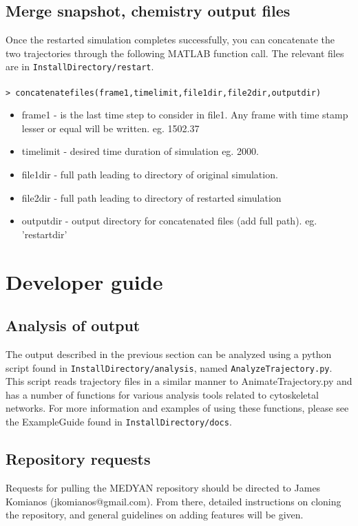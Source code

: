 \documentclass[11pt, oneside]{article}   	%
\begin{document}
\subsection{Merge snapshot, chemistry output files}
Once the restarted simulation completes successfully, you can concatenate the two trajectories through the following MATLAB function call. The relevant files are in \texttt{InstallDirectory/restart}.  \\ \\
\noindent \texttt{> concatenatefiles(frame1,time\textunderscore limit,file1dir,file2dir,outputdir)}\\
\begin{itemize}
\item frame1 - is the last time step to consider in file1. Any frame with time stamp lesser or equal will be written. eg. 1502.37
\item time\textunderscore limit - desired time duration of simulation eg. 2000.
\item file1dir - full path leading to directory of original simulation.
\item file2dir - full path leading to directory of restarted simulation
\item outputdir - output directory for concatenated files (add full path). eg. 'restartdir'
\end{itemize}
\section{Developer guide}

\subsection{Analysis of output}

The output described in the previous section can be analyzed using a python script found in \texttt{InstallDirectory/analysis}, named \texttt{AnalyzeTrajectory.py}. This script reads trajectory files in a similar manner to AnimateTrajectory.py and has a number of functions for various analysis tools related to cytoskeletal networks. For more information and examples of using these functions, please see the ExampleGuide found in \texttt{InstallDirectory/docs}.

\subsection{Repository requests}

Requests for pulling the MEDYAN repository should be directed to James Komianos (jkomianos@gmail.com). From there, detailed instructions on cloning the repository, and general guidelines on adding features will be given.
\end{document}
